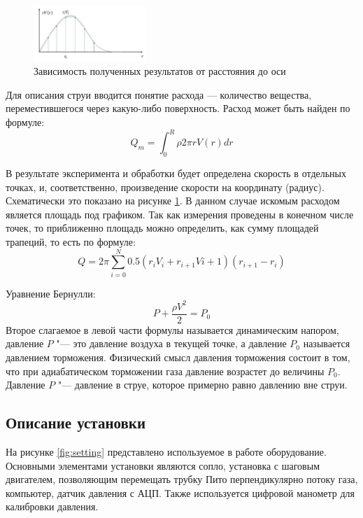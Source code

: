             \begin{figure}
                \includegraphics[width=0.38\textwidth]{images/data_example}
                \caption{Зависимость полученных результатов от расстояния до оси}
                \label{fig:data}
            \end{figure}
            Для описания струи вводится понятие расхода --- количество вещества, переместившегося через какую-либо поверхность. Расход может быть найден по формуле:
            \begin{equation}
                \label{eq:expence}
                Q_m = \int_0^R \rho 2\pi rV(r)dr
            \end{equation}

            В результате эксперимента и обработки будет определена скорость в отдельных точках, и, соответственно, произведение скорости на координату (радиус). Схематически это показано на рисунке \ref{fig:data}. В данном случае искомым расходом является площадь под графиком. Так как измерения проведены в конечном числе точек, то приближенно площадь можно определить, как сумму площадей трапеций, то есть по формуле:
            \begin{equation}
                \label{eq:final_expence}
                Q = 2\pi \sum_{i=0}^N 0.5\left(r_iV_i+r_{i+1}V{i+1}\right)\left(r_{i+1} - r_i\right)
            \end{equation}

            Уравнение Бернулли:
            \begin{equation}
                \label{eq:bernoulli}
                P + \frac{\rho V^2}{2} = P_0
            \end{equation}
            Второе слагаемое в левой части формулы называется динамическим напором, давление $P$ "--- это давление воздуха в текущей точке, а давление $P_0$ называется давлением торможения. Физический смысл давления торможения состоит в том, что при адиабатическом торможении газа давление возрастет до величины $P_0$. Давление $P$ "--- давление в струе, которое примерно равно давлению вне струи.
    
        \subsection*{Описание установки}
            На рисунке \ref{fig:setting} представлено используемое в работе оборудование. Основными элементами установки являются сопло, установка с шаговым двигателем, позволяющим перемещать трубку Пито перпендикулярно потоку газа, компьютер, датчик давления с АЦП. Также используется цифровой манометр для калибровки давления.
            
